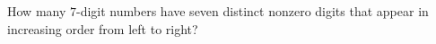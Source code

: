 How many $7$-digit numbers have seven distinct nonzero digits that appear in increasing order from left to right?
